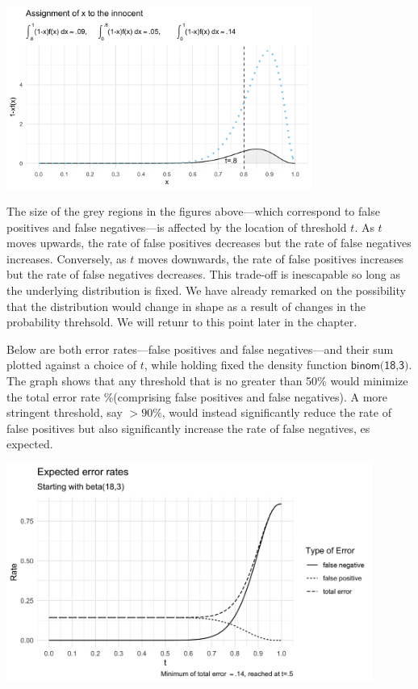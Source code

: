 \documentclass[10pt,dvipsnames,enabledeprecatedfontcommands]{scrartcl}
\begin{document}
\begin{center}
    \includegraphics[width=10cm]{nxfx3.png}
\end{center}

The size of the grey regions in the figures above---which correspond to
false positives and false negatives---is affected by the location of
threshold \(t\). As \(t\) moves upwards, the rate of false positives
decreases but the rate of false negatives increases. Conversely, as
\(t\) moves downwards, the rate of false positives increases but the
rate of false negatives decreases. This trade-off is inescapable so long
as the underlying distribution is fixed. We have already remarked on the
possibility that the distribution would change in shape as a result of
changes in the probability threhsold. We will retunr to this point later
in the chapter.

Below are both error rates---false positives and false negatives---and
their sum plotted against a choice of \(t\), while holding fixed the
density function \(\textsf{binom(18,3)}\). The graph shows that any
threshold that is no greater than 50\% would minimize the total error
rate \%(comprising false positives and false negatives). A more
stringent threshold, say \(>90\%\), would instead significantly reduce
the rate of false positives but also significantly increase the rate of
false negatives, es expected.

\begin{center}
    \includegraphics[width=12cm]{errors.png}
\end{center}
\end{document}
